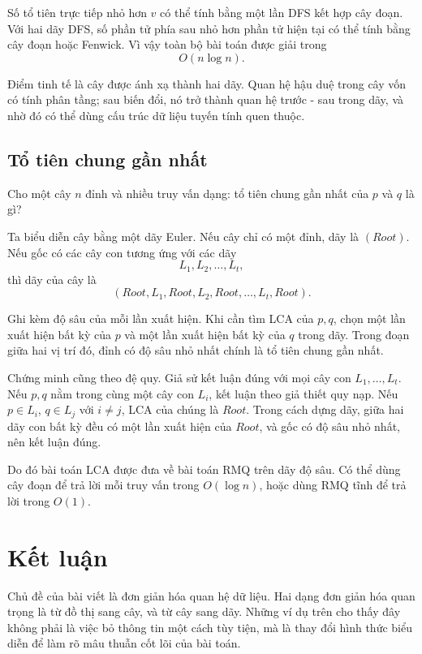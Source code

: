 \documentclass[11pt]{article}
\begin{document}
Số tổ tiên trực tiếp nhỏ hơn \(v\) có thể tính bằng một lần DFS kết hợp cây
đoạn. Với hai dãy DFS, số phần tử phía sau nhỏ hơn phần tử hiện tại có thể
tính bằng cây đoạn hoặc Fenwick. Vì vậy toàn bộ bài toán được giải trong
\[
  O(n\log n).
\]

Điểm tinh tế là cây được ánh xạ thành hai dãy. Quan hệ hậu duệ trong cây vốn
có tính phân tầng; sau biến đổi, nó trở thành quan hệ trước - sau trong dãy,
và nhờ đó có thể dùng cấu trúc dữ liệu tuyến tính quen thuộc.

\subsection{Tổ tiên chung gần nhất}

Cho một cây \(n\) đỉnh và nhiều truy vấn dạng: tổ tiên chung gần nhất của
\(p\) và \(q\) là gì?

Ta biểu diễn cây bằng một dãy Euler. Nếu cây chỉ có một đỉnh, dãy là
\((\mathit{Root})\). Nếu gốc có các cây con tương ứng với các dãy
\[
  L_1,L_2,\ldots,L_t,
\]
thì dãy của cây là
\[
  (\mathit{Root},L_1,\mathit{Root},L_2,\mathit{Root},\ldots,
  L_t,\mathit{Root}).
\]

Ghi kèm độ sâu của mỗi lần xuất hiện. Khi cần tìm LCA của \(p,q\), chọn một
lần xuất hiện bất kỳ của \(p\) và một lần xuất hiện bất kỳ của \(q\) trong
dãy. Trong đoạn giữa hai vị trí đó, đỉnh có độ sâu nhỏ nhất chính là tổ tiên
chung gần nhất.

Chứng minh cũng theo đệ quy. Giả sử kết luận đúng với mọi cây con
\(L_1,\ldots,L_t\). Nếu \(p,q\) nằm trong cùng một cây con \(L_i\), kết luận
theo giả thiết quy nạp. Nếu \(p\in L_i\), \(q\in L_j\) với \(i\ne j\), LCA
của chúng là \(\mathit{Root}\). Trong cách dựng dãy, giữa hai dãy con bất kỳ
đều có một lần xuất hiện của \(\mathit{Root}\), và gốc có độ sâu nhỏ nhất, nên
kết luận đúng.

Do đó bài toán LCA được đưa về bài toán RMQ trên dãy độ sâu. Có thể dùng cây
đoạn để trả lời mỗi truy vấn trong \(O(\log n)\), hoặc dùng RMQ tĩnh để trả
lời trong \(O(1)\).

\section{Kết luận}

Chủ đề của bài viết là đơn giản hóa quan hệ dữ liệu. Hai dạng đơn giản hóa
quan trọng là từ đồ thị sang cây, và từ cây sang dãy. Những ví dụ trên cho
thấy đây không phải là việc bỏ thông tin một cách tùy tiện, mà là thay đổi
hình thức biểu diễn để làm rõ mâu thuẫn cốt lõi của bài toán.
\end{document}
